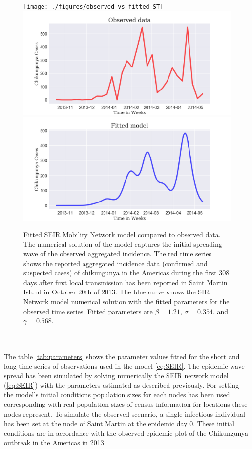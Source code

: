 \documentclass[10pt,a4paper]{article}
\begin{document}
\begin{figure}[ht]
\centering
\texttt{[image: ./figures/observed\_vs\_fitted\_ST]}\\
\includegraphics[scale=.5]{./figuras/observed_ST}\\
\includegraphics[scale=.5]{./figuras/fitted_ST}
\caption{\small Fitted SEIR Mobility Network model compared to observed data. The numerical solution of the model  captures the initial spreading wave of the observed aggregated incidence. The red time series shows the reported aggregated incidence data (confirmed and suspected cases) of chikungunya in the Americas during the first 308 days after first local transmission has been reported in Saint Martin Island in October 20th of 2013. The blue curve shows the SIR Network model numerical solution with the fitted parameters for the observed time series. Fitted parameters are $\beta=1.21$, $\sigma=0.354$, and $\gamma=0.568$.}
\label{fig:fitted-seir}
\end{figure}
%
\\\\
The table \ref{tab:parameters} shows the parameter values fitted for the short and long time series of observations used in the model \ref{eq:SEIR}. The epidemic wave spread has been simulated by solving numerically the SEIR network model (\ref{eq:SEIR}) with the parameters estimated as described previously. For setting the model's initial conditions population sizes for each nodes has been used corresponding with real population sizes of census information for locations these nodes represent. To simulate the observed scenario, a single infectious individual has been set at the node of Saint Martin at the epidemic day 0. These initial conditions are in accordance with the observed epidemic plot of the Chikungunya outbreak in the Americas in 2013. 
\end{document}
